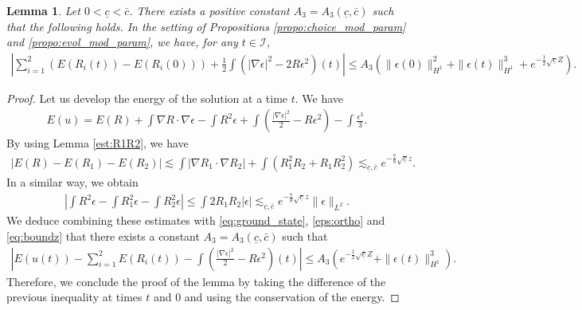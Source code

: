 \documentclass[reqno,10pt]{amsart}
\newtheorem{lemm}{Lemma}[section]
\numberwithin{equation}{section}
\begin{document}
	\begin{lemm}\label{lemm:energy}
		Let $0<\underline{c}<\bar{c}$. There exists a positive constant $A_3=A_3(\underline{c},\bar{c})$ such that the following holds. In the setting of Propositions \ref{propo:choice_mod_param} and \ref{propo:evol_mod_param}, we have, for any $t \in \mathcal{I}$,
		\begin{align*}
			\left\vert \sum_{i=1}^2 \left( E(R_i(t))- E(R_i(0))\right) + \frac12 \int \left( \vert \nabla \epsilon \vert^2 - 2 R \epsilon^2 \right)(t) \right\vert \leq A_3 \left( \| \epsilon (0) \|_{H^1}^2 + \| \epsilon(t) \|_{H^1}^3 + e^{-\frac12 \sqrt{\underline{c}}Z} \right).
		\end{align*}
	\end{lemm}
	
	\begin{proof}
		Let us develop the energy of the solution at a time $t$. We have
		\begin{align*}
			E(u)= E(R) + \int \nabla R \cdot \nabla \epsilon - \int R^2 \epsilon + \int \left( \frac{\vert \nabla \epsilon \vert^2}{2} - R\epsilon^2 \right) - \int \frac{\epsilon^3}{3}.
		\end{align*}
		By using Lemma \ref{est:R1R2}, we have
		\begin{align*}
			\left\vert E(R) - E(R_1)- E(R_2) \right\vert \lesssim \int \left\vert \nabla R_1 \cdot \nabla R_2 \right\vert + \int \left( R_1^2 R_2 + R_1 R_2^2 \right) \lesssim_{\underline{c}, \bar{c}} e^{-\frac78 \sqrt{\underline{c}} z}.
		\end{align*}
		In a similar way, we obtain
		\begin{align*}
			\left\vert \int R^2 \epsilon - \int R_1^2 \epsilon - \int R_2^2 \epsilon \right\vert \leq \int 2 R_1 R_2 \vert \epsilon \vert \lesssim_{\underline{c}, \bar{c}} e^{-\frac78 \sqrt{\underline{c}}z} \| \epsilon \|_{L^2}.
		\end{align*}
		We deduce combining these estimates with \eqref{eq:ground_state}, \eqref{eps:ortho} and \eqref{eq:boundz} that there exists a constant $A_3=A_3(\underline{c},\bar{c})$ such that
		\begin{align*}
			\left\vert E(u(t))- \sum_{i=1}^2 E(R_i(t)) - \int \left( \frac{\vert \nabla \epsilon \vert^2}{2} - R \epsilon^2 \right)(t) \right\vert \leq A_3 \left( e^{-\frac12 \sqrt{\underline{c}}Z} + \| \epsilon(t) \|_{H^1}^3 \right) .
		\end{align*}
		Therefore, we conclude the proof of the lemma by taking the difference of the previous inequality at times $t$ and $0$ and using the conservation of the energy.
	\end{proof}
	
\end{document}
